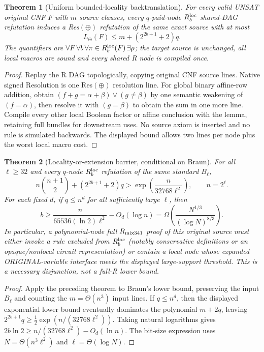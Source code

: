 \documentclass[11pt]{article}
\newtheorem{theorem}{Theorem}
\begin{document}
\begin{theorem}[Uniform bounded-locality backtranslation]
For every valid UNSAT original CNF $F$ with $m$ source clauses, every $q$-paid-node $R^{\rm loc}_b$ shared-DAG refutation induces a Res$(\oplus)$ refutation of the \emph{same exact source} with at most
\[
\boxed{L_\oplus(F)\le m+(2^{2b+1}+2)q.}
\]
The quantifiers are $\forall F\,\forall b\,\forall\pi\in R^{\rm loc}_b(F)\,\exists\rho$; the target source is unchanged, all local macros are sound and every shared R node is compiled once.
\end{theorem}
\begin{proof}
Replay the R DAG topologically, copying original CNF source lines. Native signed Resolution is one Res$(\oplus)$ resolution line. For global binary affine-row addition, obtain $(f+g=\alpha+\beta)\vee(g\ne\beta)$ by one semantic weakening of $(f=\alpha)$, then resolve it with $(g=\beta)$ to obtain the sum in one more line. Compile every other local Boolean factor or affine conclusion with the lemma, retaining full bundles for downstream uses. No source axiom is inserted and no rule is simulated backwards. The displayed bound allows two lines per node plus the worst local macro cost.
\end{proof}

\begin{theorem}[Locality-or-extension barrier, conditional on Braun]
For all $\ell\ge32$ and every $q$-node $R^{\rm loc}_b$ refutation of the same standard $B_\ell$,
\[
 n\binom{n+1}{2}+(2^{2b+1}+2)q>
 \exp\left(\frac{n}{32768\ell^2}\right),\qquad n=2^\ell.
\]
For each fixed $d$, if $q\le n^d$ for all sufficiently large $\ell$, then
\[
\boxed{b\ge\frac{n}{65536(\ln 2)\ell^2}-O_d(\log n)
=\Omega\left(\frac{N^{1/3}}{(\log N)^{8/3}}\right).}
\]
In particular, a polynomial-node full $R_{\rm mix341}$ proof of this original source \emph{must} either invoke a rule excluded from $R^{\rm loc}_b$ (notably conservative definitions or an opaque/nonlocal circuit representation) or contain a local node whose expanded ORIGINAL-variable interface meets the displayed large-support threshold. This is a necessary disjunction, not a full-R lower bound.
\end{theorem}
\begin{proof}
Apply the preceding theorem to Braun's lower bound, preserving the input $B_\ell$ and counting the $m=\Theta(n^3)$ input lines. If $q\le n^d$, then the displayed exponential lower bound eventually dominates the polynomial $m+2q$, leaving $2^{2b+1}q\ge\frac12\exp(n/(32768\ell^2))$. Taking natural logarithms gives $2b\ln2\ge n/(32768\ell^2)-O_d(\ln n)$. The bit-size expression uses $N=\Theta(n^3\ell^2)$ and $\ell=\Theta(\log N)$.
\end{proof}
\end{document}
